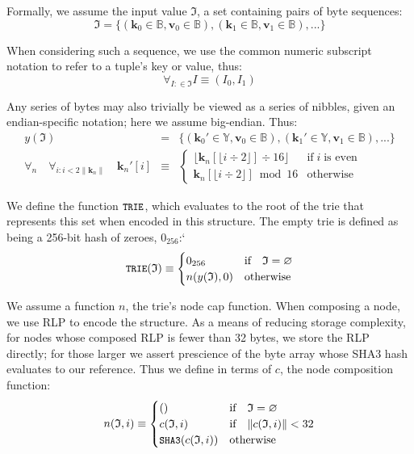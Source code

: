 \documentclass[9pt,oneside]{amsart}
\begin{document}
Formally, we assume the input value $\mathfrak{I}$, a set containing pairs of byte sequences:
\begin{equation}
\mathfrak{I} = \{ (\mathbf{k}_0 \in \mathbb{B}, \mathbf{v}_0 \in \mathbb{B}), (\mathbf{k}_1 \in \mathbb{B}, \mathbf{v}_1 \in \mathbb{B}), ... \}
\end{equation}

When considering such a sequence, we use the common numeric subscript notation to refer to a tuple's key or value, thus:
\begin{equation}
\forall_{I: \in \mathfrak{I}} I \equiv (I_0, I_1)
\end{equation}

Any series of bytes may also trivially be viewed as a series of nibbles, given an endian-specific notation; here we assume big-endian. Thus:
\begin{eqnarray}
y(\mathfrak{I}) & = & \{ (\mathbf{k}_0' \in \mathbb{Y}, \mathbf{v}_0 \in \mathbb{B}), (\mathbf{k}_1' \in \mathbb{Y}, \mathbf{v}_1 \in \mathbb{B}), ... \} \\
\forall_n \quad \forall_{i: i < 2\lVert\mathbf{k}_n\rVert} \quad \mathbf{k}_n'[i] & \equiv &
\begin{cases}
\lfloor \mathbf{k}_n[\lfloor i \div 2 \rfloor] \div 16 \rfloor & \text{if} \; i \; \text{is even} \\
\mathbf{k}_n[\lfloor i \div 2 \rfloor] \bmod 16 & \text{otherwise}
\end{cases}
\end{eqnarray}

We define the function $\texttt{\small TRIE}$, which evaluates to the root of the trie that represents this set when encoded in this structure. The empty trie is defined as being a 256-bit hash of zeroes, $0_{256}$:`
\begin{equation}
\texttt{\small TRIE}(\mathfrak{I}) \equiv \begin{cases}
0_{256} & \text{if} \quad \mathfrak{I} = \varnothing \\
n(y(\mathfrak{I}), 0) & \text{otherwise}
\end{cases}
\end{equation}

We assume a function $n$, the trie's node cap function. When composing a node, we use RLP to encode the structure. As a means of reducing storage complexity, for nodes whose composed RLP is fewer than 32 bytes, we store the RLP directly; for those larger we assert prescience of the byte array whose SHA3 hash evaluates to our reference. Thus we define in terms of $c$, the node composition function:
\begin{equation}
n(\mathfrak{I}, i) \equiv \begin{cases}
() & \text{if} \quad \mathfrak{I} = \varnothing \\
c(\mathfrak{I}, i) & \text{if} \quad \lVert c(\mathfrak{I}, i)\rVert < 32 \\
\texttt{\small SHA3}(c(\mathfrak{I}, i)) & \text{otherwise}
\end{cases}
\end{equation}
\end{document}
